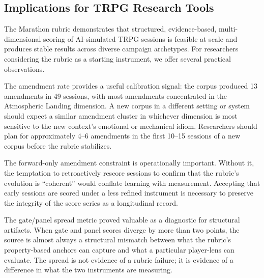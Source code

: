 \subsection{Implications for TRPG Research Tools}

The Marathon rubric demonstrates that structured, evidence-based, multi-dimensional
scoring of AI-simulated TRPG sessions is feasible at scale and produces stable results
across diverse campaign archetypes. For researchers considering the rubric as a
starting instrument, we offer several practical observations.

The amendment rate provides a useful calibration signal: the corpus produced 13
amendments in 49 sessions, with most amendments concentrated in the Atmospheric Landing
dimension. A new corpus in a different setting or system should expect a similar
amendment cluster in whichever dimension is most sensitive to the new context's
emotional or mechanical idiom. Researchers should plan for approximately 4--6 amendments
in the first 10--15 sessions of a new corpus before the rubric stabilizes.

The forward-only amendment constraint is operationally important. Without it, the
temptation to retroactively rescore sessions to confirm that the rubric's evolution is
``coherent'' would conflate learning with measurement. Accepting that early sessions
are scored under a less refined instrument is necessary to preserve the integrity of
the score series as a longitudinal record.

The gate/panel spread metric proved valuable as a diagnostic for structural artifacts.
When gate and panel scores diverge by more than two points, the source is almost always
a structural mismatch between what the rubric's property-based anchors can capture and
what a particular player-lens can evaluate. The spread is not evidence of a rubric
failure; it is evidence of a difference in what the two instruments are measuring.

